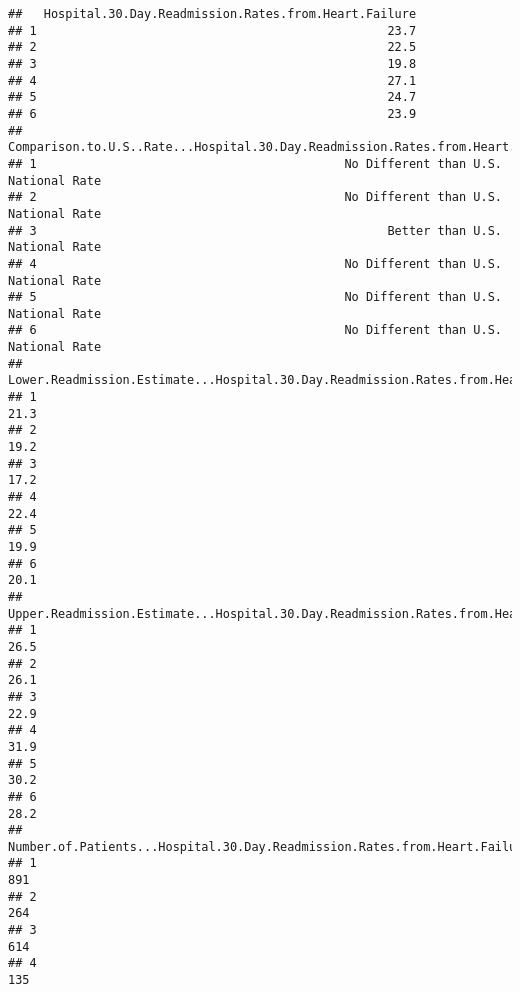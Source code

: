 \documentclass[]{article}
\begin{document}
\begin{verbatim}
##   Hospital.30.Day.Readmission.Rates.from.Heart.Failure
## 1                                                 23.7
## 2                                                 22.5
## 3                                                 19.8
## 4                                                 27.1
## 5                                                 24.7
## 6                                                 23.9
##   Comparison.to.U.S..Rate...Hospital.30.Day.Readmission.Rates.from.Heart.Failure
## 1                                           No Different than U.S. National Rate
## 2                                           No Different than U.S. National Rate
## 3                                                 Better than U.S. National Rate
## 4                                           No Different than U.S. National Rate
## 5                                           No Different than U.S. National Rate
## 6                                           No Different than U.S. National Rate
##   Lower.Readmission.Estimate...Hospital.30.Day.Readmission.Rates.from.Heart.Failure
## 1                                                                              21.3
## 2                                                                              19.2
## 3                                                                              17.2
## 4                                                                              22.4
## 5                                                                              19.9
## 6                                                                              20.1
##   Upper.Readmission.Estimate...Hospital.30.Day.Readmission.Rates.from.Heart.Failure
## 1                                                                              26.5
## 2                                                                              26.1
## 3                                                                              22.9
## 4                                                                              31.9
## 5                                                                              30.2
## 6                                                                              28.2
##   Number.of.Patients...Hospital.30.Day.Readmission.Rates.from.Heart.Failure
## 1                                                                       891
## 2                                                                       264
## 3                                                                       614
## 4                                                                       135

\end{verbatim}
\end{document}
